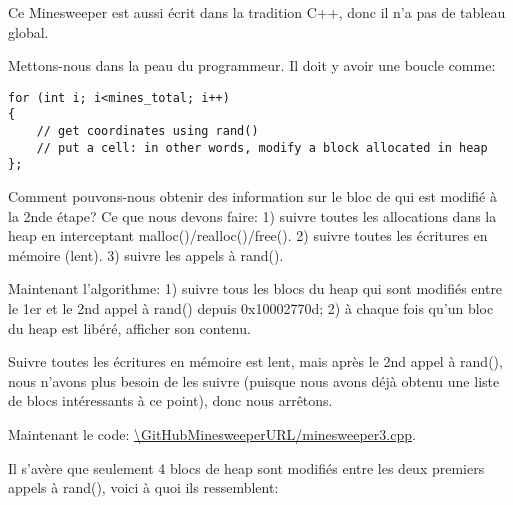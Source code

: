 Ce Minesweeper est aussi écrit dans la tradition C++, donc il n'a pas de tableau
global.

Mettons-nous dans la peau du programmeur.
Il doit y avoir une boucle comme:

\begin{lstlisting}
for (int i; i<mines_total; i++)
{
	// get coordinates using rand()
	// put a cell: in other words, modify a block allocated in heap
};
\end{lstlisting}

Comment pouvons-nous obtenir des information sur le bloc de qui est modifié à la
2nde étape?
Ce que nous devons faire:
1) suivre toutes les allocations dans la heap en interceptant malloc()/realloc()/free().
2) suivre toutes les écritures en mémoire (lent).
3) suivre les appels à rand().

Maintenant l'algorithme:
1) suivre tous les blocs du heap qui sont modifiés entre le 1er et le 2nd appel à
rand() depuis 0x10002770d;
2) à chaque fois qu'un bloc du heap est libéré, afficher son contenu.

Suivre toutes les écritures en mémoire est lent, mais après le 2nd appel à rand(),
nous n'avons plus besoin de les suivre (puisque nous avons déjà obtenu une liste
de blocs intéressants à ce point), donc nous arrêtons.

Maintenant le code: \url{\GitHubMinesweeperURL/minesweeper3.cpp}.

Il s'avère que seulement 4 blocs de heap sont modifiés entre les deux premiers appels
à rand(), voici à quoi ils ressemblent:


